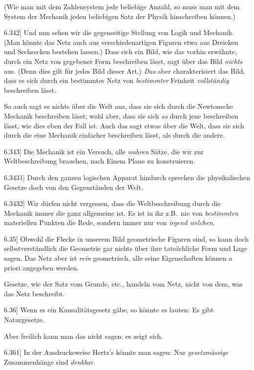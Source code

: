 \documentclass[12pt,oneside]{book}[2007/10/19]
\newcommand{\PropERef}[1]{\hyperref[PropE:#1]{#1}}
\newcommand{\PropositionG}[2]{%
  \item[\phantomsection\label{PropG:#1}\PropERef{#1}] #2%
}
\newcommand{\Emph}[1]{\emph{#1}}%
\newcommand{\zumBeispiel}{z.\;B.}
\begin{document}
\begin{propositions}
{(Wie man mit dem Zahlensystem jede beliebige
Anzahl, so muss man mit dem System der
Mechanik jeden beliebigen Satz der Physik
hinschreiben können.)}


\PropositionG{6.342}
{Und nun sehen wir die gegenseitige Stellung
von Logik und Mechanik. (Man könnte das Netz
auch aus verschiedenartigen Figuren etwa aus
Dreie\discretionary{k-}{}{c}ken und Sechsecken bestehen lassen.) Dass
sich ein Bild, wie das vorhin erwähnte, durch ein
Netz von gegebener Form beschreiben lässt, sagt
über das Bild \Emph{nichts} aus. (Denn dies gilt für
jedes Bild dieser Art.) \Emph{Das} aber charakterisiert
das Bild, dass es sich durch ein bestimmtes Netz
von \Emph{bestimmter} Feinheit \Emph{vollständig} beschreiben
lässt.

So auch sagt es nichts über die Welt aus, dass
sie sich durch die Newtonsche Mechanik beschreiben
lässt; wohl aber, dass sie sich \Emph{so} durch
jene beschreiben lässt, wie dies eben der Fall ist.
Auch das sagt etwas über die Welt, dass sie sich
durch die eine Mechanik einfacher beschreiben
lässt, als durch die andere.}


\PropositionG{6.343}
{Die Mechanik ist ein Versuch, alle \Emph{wahren}
Sätze, die wir zur Weltbeschreibung brauchen,
nach Einem Plane zu konstruieren.}


\PropositionG{6.3431}
{Durch den ganzen logischen Apparat hindurch
sprechen die physikalischen Gesetze doch von den
Gegenständen der Welt.}


\PropositionG{6.3432}
{Wir dürfen nicht vergessen, dass die Weltbeschreibung
durch die Mechanik immer die ganz
allgemeine ist. Es ist in ihr \zumBeispiel\ nie von
\Emph{bestimmten} materiellen Punkten die Rede,
sondern immer nur von \Emph{irgend welchen}.}


\PropositionG{6.35}
{Obwohl die Flecke in unserem Bild geometrische
Figuren sind, so kann doch selbstverständlich
die Geometrie gar nichts über ihre
tatsächliche Form und Lage sagen. Das Netz
aber ist \Emph{rein} geometrisch, alle seine Eigenschaften
können a priori angegeben werden.

Gesetze, wie der Satz vom Grunde, etc., handeln
vom Netz, nicht von dem, was das Netz beschreibt.}


\PropositionG{6.36}
{Wenn es ein Kausalitätsgesetz gäbe, so könnte
es lauten: \glqq{}Es gibt Naturgesetze\grqq{}.

Aber freilich kann man das nicht sagen: es
zeigt sich.}


\PropositionG{6.361}
{In der Ausdrucksweise Hertz's könnte man
sagen: Nur \Emph{gesetzmässige} Zusammenhänge
sind \Emph{denkbar}.}



\end{propositions}
\end{document}
